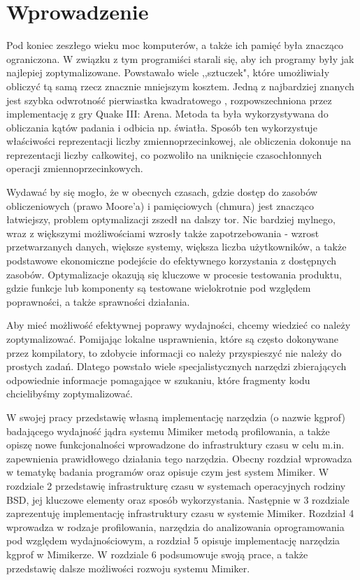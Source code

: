 \documentclass[shortabstract]{iithesis}
\author         {Wiktor Pilarczyk}
\theoremstyle{definition} \newtheorem*{definition}{Definicja}
\theoremstyle{definition} \newtheorem*{example}{Przykład}
\theoremstyle{definition} \newtheorem*{remark}{Uwaga}
\begin{document}

\chapter{Wprowadzenie}

Pod koniec zeszłego wieku moc komputerów, a także ich pamięć była znacząco ograniczona. W związku z tym programiści starali się, aby ich programy były jak najlepiej zoptymalizowane. Powstawało wiele ,,sztuczek", które umożliwiały obliczyć tą samą rzecz znacznie mniejszym kosztem. Jedną z najbardziej znanych jest szybka odwrotność pierwiastka kwadratowego \cite{bib:fisr}, rozpowszechniona przez implementację z gry Quake III: Arena. Metoda ta była wykorzystywana do obliczania kątów padania i odbicia np. światła. Sposób ten wykorzystuje właściwości reprezentacji liczby zmiennoprzecinkowej, ale obliczenia dokonuje na reprezentacji liczby całkowitej, co pozwoliło na uniknięcie czasochłonnych operacji zmiennoprzecinkowych.

Wydawać by się mogło, że w obecnych czasach, gdzie dostęp do zasobów obliczeniowych (prawo Moore'a) i pamięciowych (chmura) jest znacząco łatwiejszy, problem optymalizacji zszedł na dalszy tor. Nic bardziej mylnego, wraz z większymi możliwościami wzrosły także zapotrzebowania - wzrost przetwarzanych danych, większe systemy, większa liczba użytkowników, a także podstawowe ekonomiczne podejście do efektywnego korzystania z dostępnych zasobów. Optymalizacje okazują się kluczowe w procesie testowania produktu, gdzie funkcje lub komponenty są testowane wielokrotnie pod względem poprawności, a także sprawności działania. 

Aby mieć możliwość efektywnej poprawy wydajności, chcemy wiedzieć co należy zoptymalizować. Pomijając lokalne usprawnienia, które są często dokonywane przez kompilatory, to zdobycie informacji co należy przyspieszyć nie należy do prostych zadań. Dlatego powstało wiele specjalistycznych narzędzi zbierających odpowiednie informacje pomagające w szukaniu, które fragmenty kodu chcielibyśmy zoptymalizować.

W swojej pracy przedstawię własną implementację narzędzia (o nazwie kgprof)  badającego wydajność jądra systemu Mimiker metodą profilowania, a także opiszę nowe funkcjonalności wprowadzone do infrastruktury czasu w celu m.in.  zapewnienia prawidłowego działania tego narzędzia. Obecny rozdział wprowadza w tematykę badania programów oraz opisuje czym jest system Mimiker. W rozdziale 2 przedstawię infrastrukturę czasu w systemach operacyjnych rodziny BSD, jej kluczowe elementy oraz sposób wykorzystania. Następnie w 3 rozdziale zaprezentuję implementację infrastruktury czasu w systemie Mimiker. Rozdział 4 wprowadza w rodzaje profilowania, narzędzia do analizowania oprogramowania pod względem wydajnościowym, a rozdział 5 opisuje implementację narzędzia kgprof w Mimikerze. W rozdziale 6 podsumowuje swoją prace, a także przedstawię dalsze możliwości rozwoju systemu Mimiker.
\end{document}
